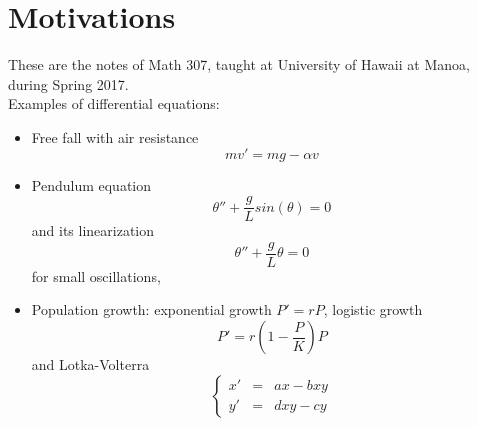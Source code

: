 \section*{Motivations}

These are the notes of Math 307, taught at University of Hawaii at Manoa, during Spring 2017. \\

Examples of differential equations:
\begin{itemize}
\item Free fall with air resistance
\[mv' = mg - \alpha v\]
\item Pendulum equation
\[\theta'' + \frac{g}{L} sin(\theta ) = 0\]
and its linearization
\[\theta'' + \frac{g}{L} \theta = 0\]
for small oscillations,
\item Population growth: exponential growth $P' = rP $, logistic growth
\[ P' = r(1-\frac{P}{K})P\]
and Lotka-Volterra
\[\left\{\begin{array}{ccc}
x' & = & a x - b xy \\
y' & = & d xy - cy
\end{array}\right.\]
\end{itemize}


